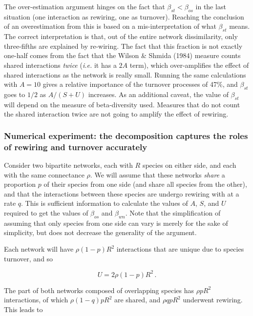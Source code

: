 \documentclass[11pt]{article}
\begin{document}
The over-estimation argument hinges on the fact that
\(\beta_{st} < \beta_{os}\) in the last situation (one interaction as
rewiring, one as turnover). Reaching the conclusion of an overestimation
from this is based on a mis-interpretation of what \(\beta_{st}\) means.
The correct interpretation is that, out of the entire network
dissimilarity, only three-fifths are explained by re-wiring. The fact
that this fraction is not exactly one-half comes from the fact that the
Wilson \& Shmida (1984) measure counts shared interactions \emph{twice}
(\emph{i.e.} it has a \(2A\) term), which over-amplifies the effect of
shared interactions as the network is really small. Running the same
calculations with \(A = 10\) gives a relative importance of the turnover
processes of 47\%, and \(\beta_{st}\) goes to \(1/2\) as \(A/(S+U)\)
increases. As an additional caveat, the value of \(\beta_{st}\) will
depend on the measure of beta-diversity used. Measures that do not count
the shared interaction twice are not going to amplify the effect of
rewiring.

\hypertarget{numerical-experiment-the-decomposition-captures-the-roles-of-rewiring-and-turnover-accurately}{%
\subsubsection{Numerical experiment: the decomposition captures the
roles of rewiring and turnover
accurately}\label{numerical-experiment-the-decomposition-captures-the-roles-of-rewiring-and-turnover-accurately}}

Consider two bipartite networks, each with \(R\) species on either side,
and each with the same connectance \(\rho\). We will assume that these
networks \emph{share} a proportion \(p\) of their species from one side
(and share all species from the other), and that the interactions
between these species are undergo rewiring with at a rate \(q\). This is
sufficient information to calculate the values of \(A\), \(S\), and
\(U\) required to get the values of \(\beta_{os}\) and \(\beta_{wn}\).
Note that the simplification of assuming that only species from one side
can vary is merely for the sake of simplicity, but does not decrease the
generality of the argument.

Each network will have \(\rho(1-p)R^2\) interactions that are unique due
to species turnover, and so

\[U = 2\rho(1-p)R^2\,.\]

The part of both networks composed of overlapping species has
\(\rho pR^2\) interactions, of which \(\rho (1-q) p R^2\) are shared,
and \(\rho qp R^2\) underwent rewiring. This leads to
\end{document}

